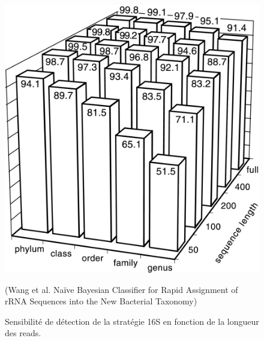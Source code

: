 \documentclass[12pt,a4paper]{article}
\begin{document}
{\begin{figure}[H]
\begin{center}
\includegraphics[scale=3]{img/zam.jpg}\hfill
\end{center}
\caption{Sensibilité de détection de la stratégie 16S en fonction de la longueur des reads.} (Wang et al. Naïve Bayesian Classifier for Rapid Assignment of rRNA Sequences into the New Bacterial Taxonomy) 
\label{rnasens}
\end{figure}

}
\end{document}
